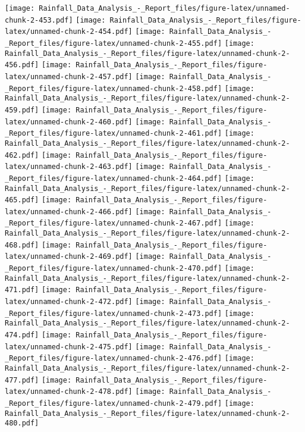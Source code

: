 \documentclass[
]{article}
\begin{document}
\texttt{[image: Rainfall\_Data\_Analysis\_-\_Report\_files/figure-latex/unnamed-chunk-2-453.pdf]}
\texttt{[image: Rainfall\_Data\_Analysis\_-\_Report\_files/figure-latex/unnamed-chunk-2-454.pdf]}
\texttt{[image: Rainfall\_Data\_Analysis\_-\_Report\_files/figure-latex/unnamed-chunk-2-455.pdf]}
\texttt{[image: Rainfall\_Data\_Analysis\_-\_Report\_files/figure-latex/unnamed-chunk-2-456.pdf]}
\texttt{[image: Rainfall\_Data\_Analysis\_-\_Report\_files/figure-latex/unnamed-chunk-2-457.pdf]}
\texttt{[image: Rainfall\_Data\_Analysis\_-\_Report\_files/figure-latex/unnamed-chunk-2-458.pdf]}
\texttt{[image: Rainfall\_Data\_Analysis\_-\_Report\_files/figure-latex/unnamed-chunk-2-459.pdf]}
\texttt{[image: Rainfall\_Data\_Analysis\_-\_Report\_files/figure-latex/unnamed-chunk-2-460.pdf]}
\texttt{[image: Rainfall\_Data\_Analysis\_-\_Report\_files/figure-latex/unnamed-chunk-2-461.pdf]}
\texttt{[image: Rainfall\_Data\_Analysis\_-\_Report\_files/figure-latex/unnamed-chunk-2-462.pdf]}
\texttt{[image: Rainfall\_Data\_Analysis\_-\_Report\_files/figure-latex/unnamed-chunk-2-463.pdf]}
\texttt{[image: Rainfall\_Data\_Analysis\_-\_Report\_files/figure-latex/unnamed-chunk-2-464.pdf]}
\texttt{[image: Rainfall\_Data\_Analysis\_-\_Report\_files/figure-latex/unnamed-chunk-2-465.pdf]}
\texttt{[image: Rainfall\_Data\_Analysis\_-\_Report\_files/figure-latex/unnamed-chunk-2-466.pdf]}
\texttt{[image: Rainfall\_Data\_Analysis\_-\_Report\_files/figure-latex/unnamed-chunk-2-467.pdf]}
\texttt{[image: Rainfall\_Data\_Analysis\_-\_Report\_files/figure-latex/unnamed-chunk-2-468.pdf]}
\texttt{[image: Rainfall\_Data\_Analysis\_-\_Report\_files/figure-latex/unnamed-chunk-2-469.pdf]}
\texttt{[image: Rainfall\_Data\_Analysis\_-\_Report\_files/figure-latex/unnamed-chunk-2-470.pdf]}
\texttt{[image: Rainfall\_Data\_Analysis\_-\_Report\_files/figure-latex/unnamed-chunk-2-471.pdf]}
\texttt{[image: Rainfall\_Data\_Analysis\_-\_Report\_files/figure-latex/unnamed-chunk-2-472.pdf]}
\texttt{[image: Rainfall\_Data\_Analysis\_-\_Report\_files/figure-latex/unnamed-chunk-2-473.pdf]}
\texttt{[image: Rainfall\_Data\_Analysis\_-\_Report\_files/figure-latex/unnamed-chunk-2-474.pdf]}
\texttt{[image: Rainfall\_Data\_Analysis\_-\_Report\_files/figure-latex/unnamed-chunk-2-475.pdf]}
\texttt{[image: Rainfall\_Data\_Analysis\_-\_Report\_files/figure-latex/unnamed-chunk-2-476.pdf]}
\texttt{[image: Rainfall\_Data\_Analysis\_-\_Report\_files/figure-latex/unnamed-chunk-2-477.pdf]}
\texttt{[image: Rainfall\_Data\_Analysis\_-\_Report\_files/figure-latex/unnamed-chunk-2-478.pdf]}
\texttt{[image: Rainfall\_Data\_Analysis\_-\_Report\_files/figure-latex/unnamed-chunk-2-479.pdf]}
\texttt{[image: Rainfall\_Data\_Analysis\_-\_Report\_files/figure-latex/unnamed-chunk-2-480.pdf]}
\end{document}
